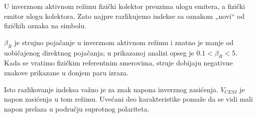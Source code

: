 U inverznom aktivnom režimu fizički kolektor preuzima ulogu emitera, a fizički emitor ulogu kolektora. Zato najpre razlikujemo indekse sa oznakom „novi“ od fizičkih oznaka na simbolu.

$\beta_R$ je strujno pojačanje u inverznom aktivnom režimu i znatno je manje od uobičajenog direktnog pojačanja; u prikazanoj analizi opseg je $0.1<\beta_R<5$. Kada se vratimo fizičkim referentnim smerovima, struje dobijaju negativne znakove prikazane u donjem paru izraza.

Isto razlikovanje indeksa važno je za znak napona inverznog zasićenja. $V_{CESI}$ je napon zasićenja u tom režimu. Uvećani deo karakteristike pomaže da se vidi mali napon prelaza u području suprotnog polariteta.
